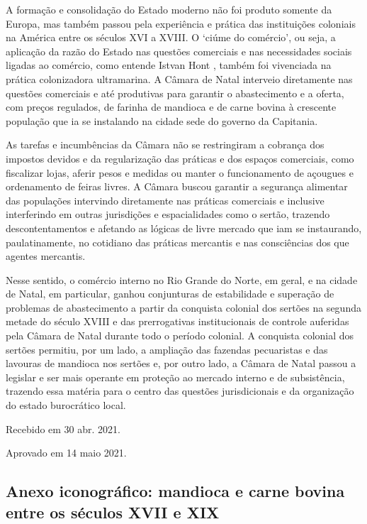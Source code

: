 \begin{refsection}
A formação e consolidação do Estado moderno não foi produto somente da Europa, mas também passou pela experiência e prática das instituições coloniais na América entre os séculos XVI a XVIII. O ‘ciúme do comércio’, ou seja, a aplicação da razão do Estado nas questões comerciais e nas necessidades sociais ligadas ao comércio, como entende Istvan Hont \citeyear{hont2005jealousy}, também foi vivenciada na prática colonizadora ultramarina. A Câmara de Natal interveio diretamente nas questões comerciais e até produtivas para garantir o abastecimento e a oferta, com preços regulados, de farinha de mandioca e de carne bovina à crescente população que ia se instalando na cidade sede do governo da Capitania.

As tarefas e incumbências da Câmara não se restringiram a cobrança dos impostos devidos e da regularização das práticas e dos espaços comerciais, como fiscalizar lojas, aferir pesos e medidas ou manter o funcionamento de açougues e ordenamento de feiras livres. A Câmara buscou garantir a segurança alimentar das populações intervindo diretamente nas práticas comerciais e inclusive interferindo em outras jurisdições e espacialidades como o sertão, trazendo descontentamentos e afetando as lógicas de livre mercado que iam se instaurando, paulatinamente, no cotidiano das práticas mercantis e nas consciências dos que agentes mercantis.

Nesse sentido, o comércio interno no Rio Grande do Norte, em geral, e na cidade de Natal, em particular, ganhou conjunturas de estabilidade e superação de problemas de abastecimento a partir da conquista colonial dos sertões na segunda metade do século XVIII e das prerrogativas institucionais de controle auferidas pela Câmara de Natal durante todo o período colonial. A conquista colonial dos sertões permitiu, por um lado, a ampliação das fazendas pecuaristas e das lavouras de mandioca nos sertões e, por outro lado, a Câmara de Natal passou a legislar e ser mais operante em proteção ao mercado interno e de subsistência, trazendo essa matéria para o centro das questões jurisdicionais e da organização do estado burocrático local. 

\printbibliography[heading=subbibliography,notcategory=fullcited]

\hfill Recebido em 30 abr. 2021.

\hfill Aprovado em 14 maio 2021.

\cleardoublepage

\begin{vplace}
    \section*{Anexo iconográfico: mandioca e carne bovina entre os séculos XVII e XIX}
\end{vplace}


\end{refsection}
